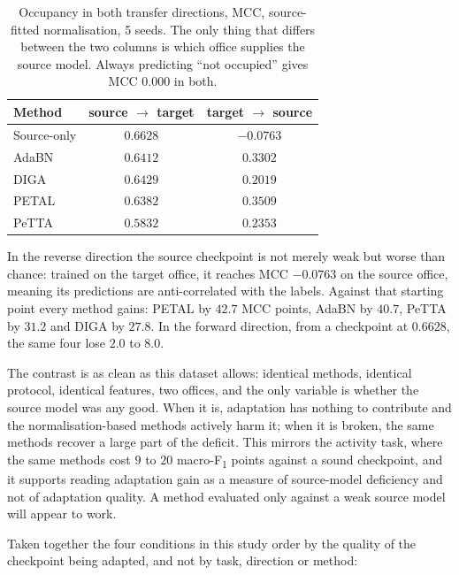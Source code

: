 \documentclass[a4paper,fleqn]{cas-dc}
\newcommand{\macf}{macro-F\textsubscript{1}}
\begin{document}
\begin{table}[t]
\centering
\caption{Occupancy in both transfer directions, MCC, source-fitted normalisation, 5 seeds.
The only thing that differs between the two columns is which office supplies the source
model. Always predicting ``not occupied'' gives MCC $0.000$ in both.}
\label{tab:oe-rev}
\small
\begin{tabular}{lcc}
\toprule
Method & source $\to$ target & target $\to$ source \\
\midrule
Source-only & $\mathbf{0.6628}$ & $-0.0763$ \\
AdaBN       & $0.6412$ & $0.3302$ \\
DIGA        & $0.6429$ & $0.2019$ \\
PETAL       & $0.6382$ & $\mathbf{0.3509}$ \\
PeTTA       & $0.5832$ & $0.2353$ \\
\bottomrule
\end{tabular}
\end{table}

In the reverse direction the source checkpoint is not merely weak but worse than chance:
trained on the target office, it reaches MCC $-0.0763$ on the source office, meaning its
predictions are anti-correlated with the labels. Against that starting point every method
gains: PETAL by $42.7$ MCC points, AdaBN by $40.7$, PeTTA by $31.2$ and DIGA by $27.8$. In
the forward direction, from a checkpoint at $0.6628$, the same four lose $2.0$ to $8.0$.

The contrast is as clean as this dataset allows: identical methods, identical protocol,
identical features, two offices, and the only variable is whether the source model was any
good. When it is, adaptation has nothing to contribute and the normalisation-based methods
actively harm it; when it is broken, the same methods recover a large part of the deficit.
This mirrors the activity task, where the same methods cost $9$ to $20$ \macf{} points
against a sound checkpoint, and it supports reading adaptation gain as a measure of
source-model deficiency and not of adaptation quality. A method evaluated only against a
weak source model will appear to work.

Taken together the four conditions in this study order by the quality of the checkpoint
being adapted, and not by task, direction or method:
\end{document}
